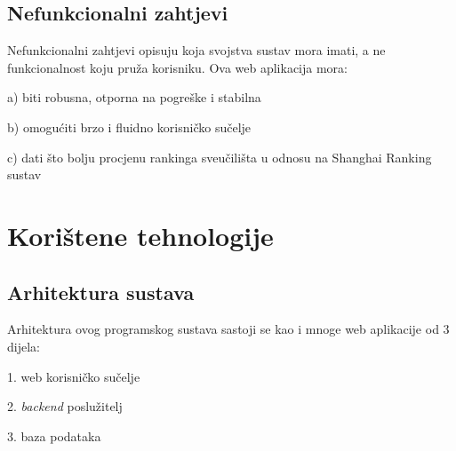 \documentclass[times, utf8, zavrsni]{fer}
\begin{document}
\section{Nefunkcionalni zahtjevi}
Nefunkcionalni zahtjevi opisuju koja svojstva sustav mora imati, a ne funkcionalnost koju pruža korisniku. Ova web aplikacija mora:

a) biti robusna, otporna na pogreške i stabilna

b) omogućiti brzo i fluidno korisničko sučelje

c) dati što bolju procjenu rankinga sveučilišta u odnosu na Shanghai Ranking sustav

\chapter{Korištene tehnologije}
\section{Arhitektura sustava}
\label{arhitektura}
Arhitektura ovog programskog sustava sastoji se kao i mnoge web aplikacije od 3 dijela:

1. web korisničko sučelje

2. \emph{backend} poslužitelj

3. baza podataka
\end{document}
